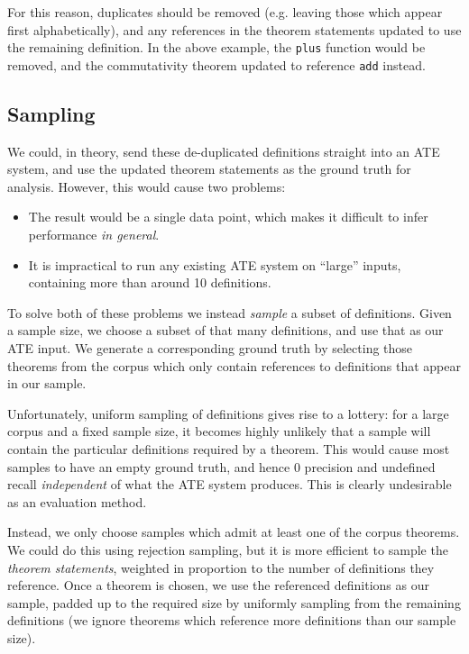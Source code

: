 For this reason, duplicates should be removed (e.g. leaving those which appear
first alphabetically), and any references in the theorem statements updated to
use the remaining definition. In the above example, the \texttt{plus} function
would be removed, and the commutativity theorem updated to reference
\texttt{add} instead.

\subsection{Sampling}

We could, in theory, send these de-duplicated definitions straight into an ATE
system, and use the updated theorem statements as the ground truth for analysis.
However, this would cause two problems:

\begin{itemize}
\item The result would be a single data point, which makes it difficult to
  infer performance \emph{in general}.
\item It is impractical to run any existing ATE system on ``large'' inputs,
  containing more than around 10 definitions.
\end{itemize}

To solve both of these problems we instead \emph{sample} a subset of
definitions. Given a sample size, we choose a subset of that many definitions,
and use that as our ATE input. We generate a corresponding ground truth by
selecting those theorems from the corpus which only contain references to
definitions that appear in our sample.

Unfortunately, uniform sampling of definitions gives rise to a lottery: for a
large corpus and a fixed sample size, it becomes highly unlikely that a sample
will contain the particular definitions required by a theorem. This would cause
most samples to have an empty ground truth, and hence $0$ precision and
undefined recall \emph{independent} of what the ATE system produces. This is
clearly undesirable as an evaluation method.

Instead, we only choose samples which admit at least one of the corpus theorems.
We could do this using rejection sampling, but it is more efficient to sample
the \emph{theorem statements}, weighted in proportion to the number of
definitions they reference. Once a theorem is chosen, we use the referenced
definitions as our sample, padded up to the required size by uniformly sampling
from the remaining definitions (we ignore theorems which reference more
definitions than our sample size).

